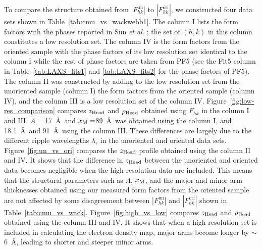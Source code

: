 To compare the structure obtained from $|F_{hk}^\text{un}|$ to $|F_{hk}^\text{ori}|$,
we constructed four data sets shown in Table~\ref{tab:cmu_vs_wackwebb1}.
The column I lists the form factors with the phases reported in Sun \textit{et al.} \cite{ref:Sun96};
the set of $(h,k)$ in this column constitutes a low resolution set.
The column IV is the form factors from the oriented sample with the phase factors
of its low resolution set identical to the column I while the rest of phase factors
are taken from PF5 (see the Fit5 column in Table~\ref{tab:LAXS_fits1} and 
\ref{tab:LAXS_fits2} for the phase factors of PF5).
The column II was constructed by adding to the low resolution set from the 
unoriented sample (column I) the form factors from the oriented sample (column IV), 
and the column III is a low resolution set of the column IV.
Figure~\ref{fig:low-res_comparison} compares $z_\text{Head}$ and $\rho_\text{Head}$ obtained
using $F_{hk}$ in the column I and III.
$A = $17~\AA\ and $x_\textrm{M} = $89~\AA\ was obtained using the column I, and 18.1~\AA\
and 91~\AA\ using the column III.
These differences are largely due to the different
ripple wavelengths $\lambda_r$ in the unoriented and oriented data sets. 
Figure~\ref{fig:un_vs_ori} compares the $z_\text{Head}$ profile obtained using the
column II and IV. It shows that the difference in $z_\text{Head}$ between the unoriented
and oriented data becomes negligible when the high resolution data are included.
This means that the structural parameters such as $A$, $x_\textrm{M}$, and the major and
minor arm thicknesses obtained using our measured form factors from the
oriented sample are not affected by some disagreement between $|F_{hk}^\text{un}|$
and $|F_{hk}^\text{ori}|$ shown in Table~\ref{tab:cmu_vs_wack}.
Figure~\ref{fig:high_vs_low} compares $z_\text{Head}$ and $\rho_\text{Head}$ obtained using 
the column III and IV. It shows that when a high resolution set is included
in calculating the electron density map, major arms become longer by 
$\sim$6~\AA, leading to shorter and steeper minor arms.

